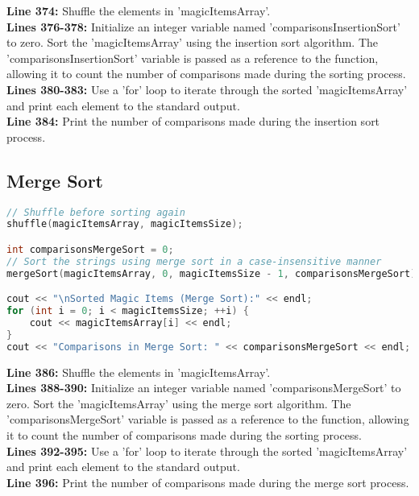\documentclass[letterpaper, 10pt,DIV=13]{scrartcl}
\numberwithin{equation}{section} %
\numberwithin{figure}{section} %
\numberwithin{table}{section} %
\begin{document}
\textbf{Line 374:} Shuffle the elements in 'magicItemsArray'. \\
\textbf{Lines 376-378:} Initialize an integer variable named 'comparisonsInsertionSort' to zero. Sort the 'magicItemsArray' using the insertion sort algorithm. The 'comparisonsInsertionSort' variable is passed as a reference to the function, allowing it to count the number of comparisons made during the sorting process. \\
\textbf{Lines 380-383:} Use a 'for' loop to iterate through the sorted 'magicItemsArray' and print each element to the standard output. \\
\textbf{Line 384:} Print the number of comparisons made during the insertion sort process.

\subsection{Merge Sort}
\begin{linenumbers}
\begin{lstlisting}[language=C++, caption={Merge Sort}, label={code:example}]
// Shuffle before sorting again
shuffle(magicItemsArray, magicItemsSize);

int comparisonsMergeSort = 0;
// Sort the strings using merge sort in a case-insensitive manner
mergeSort(magicItemsArray, 0, magicItemsSize - 1, comparisonsMergeSort);

cout << "\nSorted Magic Items (Merge Sort):" << endl;
for (int i = 0; i < magicItemsSize; ++i) {
    cout << magicItemsArray[i] << endl;
}
cout << "Comparisons in Merge Sort: " << comparisonsMergeSort << endl;
\end{lstlisting}
\end{linenumbers}
\nolinenumbers

\textbf{Line 386:} Shuffle the elements in 'magicItemsArray'. \\
\textbf{Lines 388-390:} Initialize an integer variable named 'comparisonsMergeSort' to zero. Sort the 'magicItemsArray' using the merge sort algorithm. The 'comparisonsMergeSort' variable is passed as a reference to the function, allowing it to count the number of comparisons made during the sorting process. \\
\textbf{Lines 392-395:} Use a 'for' loop to iterate through the sorted 'magicItemsArray' and print each element to the standard output. \\
\textbf{Line 396:} Print the number of comparisons made during the merge sort process.
\end{document}
